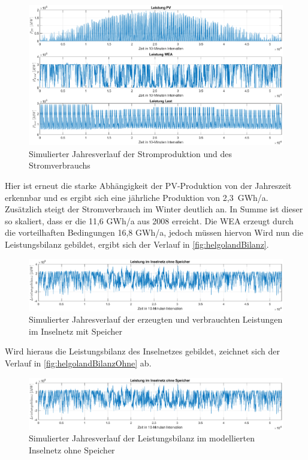 \begin{figure}[H]
	\centering
	\includegraphics[width=\linewidth]{Abbildungen/HelgolandLeistungOhne.eps}
	\caption{Simulierter Jahresverlauf der Stromproduktion und des Stromverbrauchs}
	\label{fig:helgolandVerlaufOhne}
\end{figure}

Hier ist erneut die starke Abhängigkeit der PV-Produktion von der Jahreszeit erkennbar und es ergibt sich eine jährliche Produktion von 2,3~GWh/a. Zusätzlich steigt der Stromverbrauch im Winter deutlich an. In Summe ist dieser so skaliert, dass er die 11,6 GWh/a aus 2008 erreicht. Die WEA erzeugt durch die vorteilhaften Bedingungen 16,8 GWh/a, jedoch müssen hiervon  Wird nun die Leistungsbilanz gebildet, ergibt sich der Verlauf in \autoref{fig:helgolandBilanz}.

\begin{figure}[H]
	\centering
	\includegraphics[width=\linewidth]{Abbildungen/HelgolandBilanzOhne.eps}
	\caption{Simulierter Jahresverlauf der erzeugten und verbrauchten Leistungen im Inselnetz mit Speicher}
	\label{fig:helgolandBilanz}
\end{figure}

Wird hieraus die Leistungsbilanz des Inselnetzes gebildet, zeichnet sich der Verlauf in \autoref{fig:helgolandBilanzOhne} ab.

\begin{figure}[H]
	\centering
	\includegraphics[width=\linewidth]{Abbildungen/HelgolandBilanzOhne.eps}
	\caption{Simulierter Jahresverlauf der Leistungsbilanz im modellierten Inselnetz ohne Speicher}
	\label{fig:helgolandBilanzOhne}
\end{figure}


